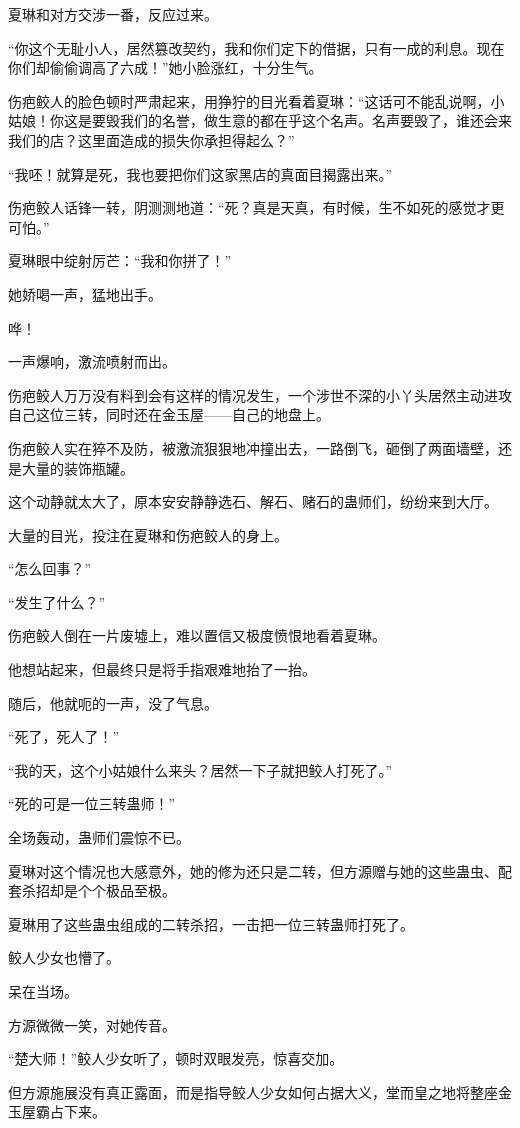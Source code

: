 \begin{this_body}
夏琳和对方交涉一番，反应过来。

“你这个无耻小人，居然篡改契约，我和你们定下的借据，只有一成的利息。现在你们却偷偷调高了六成！”她小脸涨红，十分生气。

伤疤鲛人的脸色顿时严肃起来，用狰狞的目光看着夏琳：“这话可不能乱说啊，小姑娘！你这是要毁我们的名誉，做生意的都在乎这个名声。名声要毁了，谁还会来我们的店？这里面造成的损失你承担得起么？”

“我呸！就算是死，我也要把你们这家黑店的真面目揭露出来。”

伤疤鲛人话锋一转，阴测测地道：“死？真是天真，有时候，生不如死的感觉才更可怕。”

夏琳眼中绽射厉芒：“我和你拼了！”

她娇喝一声，猛地出手。

哗！

一声爆响，激流喷射而出。

伤疤鲛人万万没有料到会有这样的情况发生，一个涉世不深的小丫头居然主动进攻自己这位三转，同时还在金玉屋——自己的地盘上。

伤疤鲛人实在猝不及防，被激流狠狠地冲撞出去，一路倒飞，砸倒了两面墙壁，还是大量的装饰瓶罐。

这个动静就太大了，原本安安静静选石、解石、赌石的蛊师们，纷纷来到大厅。

大量的目光，投注在夏琳和伤疤鲛人的身上。

“怎么回事？”

“发生了什么？”

伤疤鲛人倒在一片废墟上，难以置信又极度愤恨地看着夏琳。

他想站起来，但最终只是将手指艰难地抬了一抬。

随后，他就呃的一声，没了气息。

“死了，死人了！”

“我的天，这个小姑娘什么来头？居然一下子就把鲛人打死了。”

“死的可是一位三转蛊师！”

全场轰动，蛊师们震惊不已。

夏琳对这个情况也大感意外，她的修为还只是二转，但方源赠与她的这些蛊虫、配套杀招却是个个极品至极。

夏琳用了这些蛊虫组成的二转杀招，一击把一位三转蛊师打死了。

鲛人少女也懵了。

呆在当场。

方源微微一笑，对她传音。

“楚大师！”鲛人少女听了，顿时双眼发亮，惊喜交加。

但方源施展没有真正露面，而是指导鲛人少女如何占据大义，堂而皇之地将整座金玉屋霸占下来。

\end{this_body}

